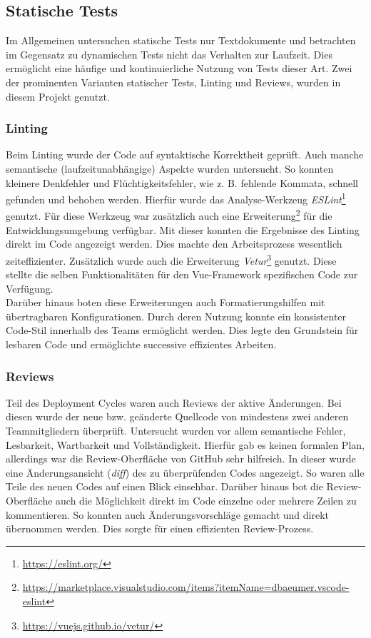 \documentclass[10pt, a4paper]{article}
\begin{document}
\subsection{Statische Tests}
Im Allgemeinen untersuchen statische Tests nur Textdokumente und betrachten im Gegensatz zu dynamischen Tests nicht das Verhalten zur Laufzeit.
Dies ermöglicht eine häufige und kontinuierliche Nutzung von Tests dieser Art.
Zwei der prominenten Varianten statischer Tests, Linting und Reviews, wurden in diesem Projekt genutzt.

\subsubsection{Linting}
Beim Linting wurde der Code auf syntaktische Korrektheit geprüft.
Auch manche semantische (laufzeitunabhängige) Aspekte wurden untersucht.
So konnten kleinere Denkfehler und Flüchtigkeitsfehler, wie z. B. fehlende Kommata, schnell gefunden und behoben werden.
Hierfür wurde das Analyse-Werkzeug \textit{ESLint}\footnote{\raggedright\url{https://eslint.org/}} genutzt.
Für diese Werkzeug war zusätzlich auch eine Erweiterung\footnote{\raggedright\url{https://marketplace.visualstudio.com/items?itemName=dbaeumer.vscode-eslint}} für die Entwicklungsumgebung verfügbar.
Mit dieser konnten die Ergebnisse des Linting direkt im Code angezeigt werden.
Dies machte den Arbeitsprozess wesentlich zeiteffizienter.
Zusätzlich wurde auch die Erweiterung \textit{Vetur}\footnote{\raggedright\url{https://vuejs.github.io/vetur/}} genutzt.
Diese stellte die selben Funktionalitäten für den Vue-Framework spezifischen Code zur Verfügung.
\\
Darüber hinaus boten diese Erweiterungen auch Formatierungshilfen mit übertragbaren Konfigurationen.
Durch deren Nutzung konnte ein konsistenter Code-Stil innerhalb des Teams ermöglicht werden.
Dies legte den Grundstein für lesbaren Code und ermöglichte successive effizientes Arbeiten.

\subsubsection{Reviews}
Teil des Deployment Cycles waren auch Reviews der aktive Änderungen.
Bei diesen wurde der neue bzw. geänderte Quellcode von mindestens zwei anderen Teammitgliedern überprüft.
Untersucht wurden vor allem semantische Fehler, Lesbarkeit, Wartbarkeit und Vollständigkeit.
Hierfür gab es keinen formalen Plan, allerdings war die Review-Oberfläche von GitHub sehr hilfreich.
In dieser wurde eine Änderungsansicht (\textit{diff}) des zu überprüfenden Codes angezeigt.
So waren alle Teile des neuen Codes auf einen Blick einsehbar.
Darüber hinaus bot die Review-Oberfläche auch die Möglichkeit direkt im Code einzelne oder mehrere Zeilen zu kommentieren.
So konnten auch Änderungsvorschläge gemacht und direkt übernommen werden.
Dies sorgte für einen effizienten Review-Prozess.
\end{document}
